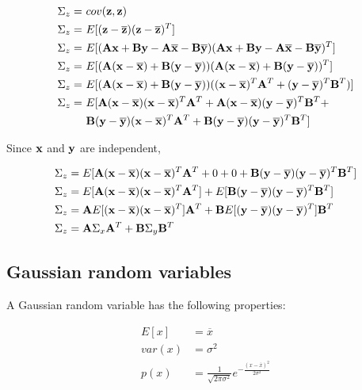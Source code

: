 \begin{align*}
  \Sigma_z =~& cov(\mathbf{z}, \mathbf{z}) \\
  \Sigma_z =~& E[(\mathbf{z} - \overline{\mathbf{z}})(\mathbf{z} - \overline{\mathbf{z}})^T] \\
  \Sigma_z =~& E[(\mathbf{A}\mathbf{x} + \mathbf{B}\mathbf{y} - \mathbf{A}\overline{\mathbf{x}} -
    \mathbf{B}\overline{\mathbf{y}})(\mathbf{A}\mathbf{x} + \mathbf{B}\mathbf{y} -
    \mathbf{A}\overline{\mathbf{x}} - \mathbf{B}\overline{\mathbf{y}})^T] \\
  \Sigma_z =~& E[(\mathbf{A}(\mathbf{x} - \overline{\mathbf{x}}) +
    \mathbf{B}(\mathbf{y} - \overline{\mathbf{y}}))
    (\mathbf{A}(\mathbf{x} - \overline{\mathbf{x}}) +
     \mathbf{B}(\mathbf{y} - \overline{\mathbf{y}}))^T] \\
  \Sigma_z =~& E[(\mathbf{A}(\mathbf{x} - \overline{\mathbf{x}}) +
    \mathbf{B}(\mathbf{y} - \overline{\mathbf{y}}))
    ((\mathbf{x} - \overline{\mathbf{x}})^T\mathbf{A}^T +
     (\mathbf{y} - \overline{\mathbf{y}})^T\mathbf{B}^T)] \\
  \Sigma_z =~& E[
    \mathbf{A}(\mathbf{x} - \overline{\mathbf{x}})(\mathbf{x} - \overline{\mathbf{x}})^T\mathbf{A}^T +
    \mathbf{A}(\mathbf{x} - \overline{\mathbf{x}})(\mathbf{y} - \overline{\mathbf{y}})^T\mathbf{B}^T + \\
    &\mathbf{B}(\mathbf{y} - \overline{\mathbf{y}})(\mathbf{x} - \overline{\mathbf{x}})^T\mathbf{A}^T +
    \mathbf{B}(\mathbf{y} - \overline{\mathbf{y}})(\mathbf{y} - \overline{\mathbf{y}})^T\mathbf{B}^T]
\end{align*}

Since $\mathbf{x}$ and $\mathbf{y}$ are independent,

\begin{align*}
  \Sigma_z &= E[
    \mathbf{A}(\mathbf{x} - \overline{\mathbf{x}})(\mathbf{x} - \overline{\mathbf{x}})^T\mathbf{A}^T + 0 + 0 +
    \mathbf{B}(\mathbf{y} - \overline{\mathbf{y}})(\mathbf{y} - \overline{\mathbf{y}})^T\mathbf{B}^T] \\
  \Sigma_z &=
    E[\mathbf{A}(\mathbf{x} - \overline{\mathbf{x}})(\mathbf{x} - \overline{\mathbf{x}})^T\mathbf{A}^T] +
    E[\mathbf{B}(\mathbf{y} - \overline{\mathbf{y}})(\mathbf{y} - \overline{\mathbf{y}})^T\mathbf{B}^T] \\
  \Sigma_z &=
    \mathbf{A}E[(\mathbf{x} - \overline{\mathbf{x}})(\mathbf{x} - \overline{\mathbf{x}})^T]\mathbf{A}^T +
    \mathbf{B}E[(\mathbf{y} - \overline{\mathbf{y}})(\mathbf{y} - \overline{\mathbf{y}})^T]\mathbf{B}^T \\
  \Sigma_z &=\mathbf{A}\Sigma_x\mathbf{A}^T + \mathbf{B}\Sigma_y\mathbf{B}^T
\end{align*}

\subsection{Gaussian random variables}

A Gaussian random variable has the following properties:

\begin{align*}
  E[x] &= \overline{x} \\
  var(x) &= \sigma^2 \\
  p(x) &= \frac{1}{\sqrt{2\pi\sigma^2}}
    e^{-\frac{(x - \overline{x})^2}{2\sigma^2}}
\end{align*}

